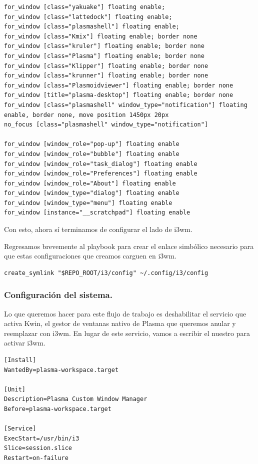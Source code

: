 \documentclass[11pt]{article}
\begin{document}
\begin{verbatim}
for_window [class="yakuake"] floating enable;
for_window [class="lattedock"] floating enable;
for_window [class="plasmashell"] floating enable;
for_window [class="Kmix"] floating enable; border none
for_window [class="kruler"] floating enable; border none
for_window [class="Plasma"] floating enable; border none
for_window [class="Klipper"] floating enable; border none
for_window [class="krunner"] floating enable; border none
for_window [class="Plasmoidviewer"] floating enable; border none
for_window [title="plasma-desktop"] floating enable; border none
for_window [class="plasmashell" window_type="notification"] floating enable, border none, move position 1450px 20px
no_focus [class="plasmashell" window_type="notification"]

for_window [window_role="pop-up"] floating enable
for_window [window_role="bubble"] floating enable
for_window [window_role="task_dialog"] floating enable
for_window [window_role="Preferences"] floating enable
for_window [window_role="About"] floating enable
for_window [window_type="dialog"] floating enable
for_window [window_type="menu"] floating enable
for_window [instance="__scratchpad"] floating enable
\end{verbatim}

Con esto, ahora sí terminamos de configurar el lado de i3wm.

Regresamos brevemente al playbook para crear el enlace simbólico necesario para que estas configuraciones que creamos carguen en i3wm.

\begin{verbatim}
create_symlink "$REPO_ROOT/i3/config" ~/.config/i3/config
\end{verbatim}
\subsubsection{Configuración del sistema.}
\label{sec:orge17eaf9}

Lo que queremos hacer para este flujo de trabajo es deshabilitar el servicio que activa Kwin, el gestor de ventanas nativo de Plasma que queremos anular y reemplazar con i3wm. En lugar de este servicio, vamos a escribir el nuestro para activar i3wm.

\begin{verbatim}
[Install]
WantedBy=plasma-workspace.target

[Unit]
Description=Plasma Custom Window Manager
Before=plasma-workspace.target

[Service]
ExecStart=/usr/bin/i3
Slice=session.slice
Restart=on-failure
\end{verbatim}
\end{document}
